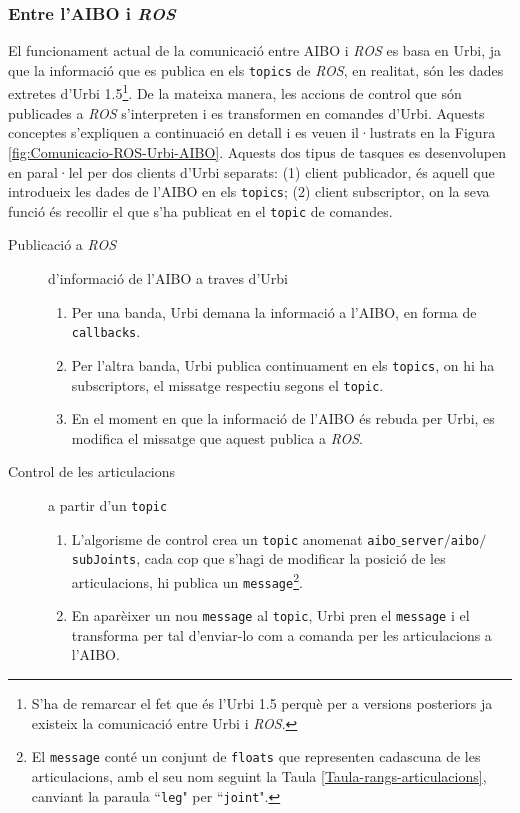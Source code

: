 \documentclass[12pt,a4paper,final,twoside]{article}
\begin{document}
\subsubsection{Entre l'AIBO i \textit{ROS}}

El funcionament actual de la comunicació entre AIBO i \textit{ROS} es basa en Urbi, ja que la informació que es publica en els \texttt{topics} de \textit{ROS}, en realitat, són les dades extretes d'Urbi 1.5\footnote{S'ha de remarcar el fet que és l'Urbi 1.5 perquè per a versions posteriors ja existeix la comunicació entre Urbi i \textit{ROS}.}. De la mateixa manera, les accions de control que són publicades a \textit{ROS} s'interpreten i es transformen en comandes d'Urbi. Aquests conceptes s'expliquen a continuació en detall i es veuen il·lustrats en la Figura \ref{fig:Comunicacio-ROS-Urbi-AIBO}. Aquests dos tipus de tasques es desenvolupen en paral·lel per dos clients d'Urbi separats: (1) client publicador, és aquell que introdueix les dades de l'AIBO en els \texttt{topics}; (2) client subscriptor, on la seva funció és recollir el que s'ha publicat en el \texttt{topic} de comandes.

\begin{description}

\item[Publicació a \textit{ROS}] d'informació de l'AIBO a traves d'Urbi
\begin{enumerate}
\item Per una banda, Urbi demana la informació a l'AIBO, en forma de \texttt{callbacks}.
\item Per l'altra banda, Urbi publica continuament en els \texttt{topics}, on hi ha subscriptors, el missatge respectiu segons el \texttt{topic}.
\item En el moment en que la informació de l'AIBO és rebuda per Urbi, es modifica el missatge que aquest publica a \textit{ROS}.
\end{enumerate}

\item[Control de les articulacions] a partir d'un \texttt{topic}
\begin{enumerate}
\item L'algorisme de control crea un \texttt{topic} anomenat \texttt{aibo$\_$server$/$aibo$/$subJoints}, cada cop que s'hagi de modificar la posició de les articulacions, hi publica un \texttt{message}\footnote{El \texttt{message} conté un conjunt de \texttt{floats} que representen cadascuna de les articulacions, amb el seu nom seguint la Taula \ref{Taula-rangs-articulacions}, canviant la paraula ``\texttt{leg}" per ``\texttt{joint}".}.
\item En aparèixer un nou \texttt{message} al \texttt{topic}, Urbi pren el \texttt{message} i el transforma per tal d'enviar-lo com a comanda per les articulacions a l'AIBO.  
\end{enumerate}

\end{description}
\end{document}
